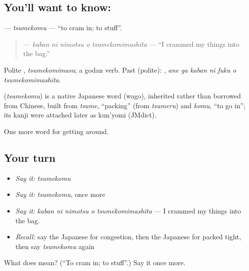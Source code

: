 \subsection*{You'll want to know: }
\textbf{} — \emph{tsumekomu} — \textquotedblleft{}to cram in; to stuff\textquotedblright{}.

\begin{quote}
\textbf{  } — \emph{kaban ni nimotsu o tsumekomimashita} — \textquotedblleft{}I crammed my things into the bag.\textquotedblright{}
\end{quote}

Polite \textbf{}, \emph{tsumekomimasu}; a godan verb. Past (polite): \textbf{   }, \emph{ane ga kaban ni fuku o tsumekomimashita}.

\begin{cousinweb}
\textbf{} (\emph{tsumekomu}) is a native Japanese word (wago), inherited rather than borrowed from Chinese, built from \emph{tsume}, \textquotedblleft{}packing\textquotedblright{} (from \emph{tsumeru}) and \emph{komu}, \textquotedblleft{}to go in\textquotedblright{}; its kanji were attached later as kun'yomi (JMdict).
\end{cousinweb}

\begin{grammarlens}[title={What you've built}]
One more word for getting around.
\end{grammarlens}

\subsection*{Your turn}
\begin{itemize}
\raggedright
  \item \emph{Say it:} \emph{tsumekomu}
  \item \emph{Say it:} \emph{tsumekomu}, once more
  \item \emph{Say it:} \emph{kaban ni nimotsu o tsumekomimashita} — I crammed my things into the bag.
  \item \emph{Recall:} say the Japanese for congestion, then the Japanese for packed tight, then say \emph{tsumekomu} again
\end{itemize}

\begin{tcolorbox}[breakable,colback=teal!4,colframe=teal!35!black,title={Before you move on}]
What does  mean? (\textquotedblleft{}To cram in; to stuff\textquotedblright{}.) Say it once more.
\end{tcolorbox}
